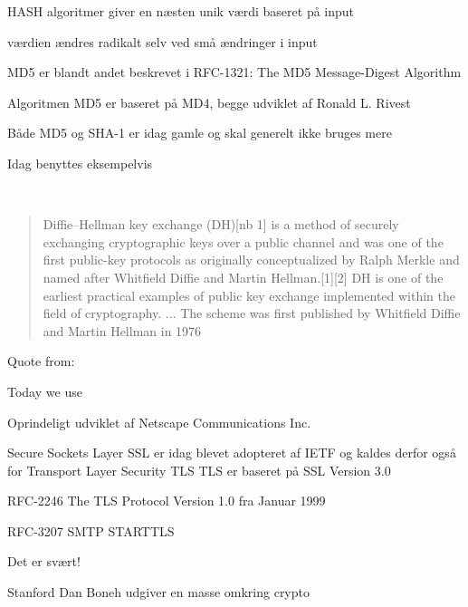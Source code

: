 \documentclass[Screen16to9,17pt]{foils}
\begin{document}


\begin{list1}
\item HASH algoritmer giver en næsten unik værdi baseret på input

\item værdien ændres radikalt selv ved små ændringer i input
\item MD5 er blandt andet beskrevet i RFC-1321: The MD5 Message-Digest
  Algorithm
\item Algoritmen MD5 er baseret på MD4, begge udviklet af Ronald
  L. Rivest
\item Både MD5 og SHA-1 er idag gamle og skal generelt ikke bruges mere
\item Idag benyttes eksempelvis 
\end{list1}




{~}

\begin{quote}
Diffie–Hellman key exchange (DH)[nb 1] is a method of securely exchanging cryptographic keys over a public channel and was one of the first public-key protocols as originally conceptualized by Ralph Merkle and named after Whitfield Diffie and Martin Hellman.[1][2] DH is one of the earliest practical examples of public key exchange implemented within the field of cryptography.
... The scheme was first published by Whitfield Diffie and Martin Hellman in 1976
\end{quote}

\begin{list2}
\item Quote from: {\small {}}
\item Today we use 
\end{list2}




\begin{list1}
\item Oprindeligt udviklet af Netscape Communications Inc.
\item Secure Sockets Layer SSL er idag blevet adopteret af IETF og kaldes
derfor også for Transport Layer Security TLS
TLS er baseret på SSL Version 3.0
\item RFC-2246 The TLS Protocol Version 1.0 fra Januar 1999
\item RFC-3207 SMTP STARTTLS
\item Det er svært!
\item Stanford Dan Boneh udgiver en masse omkring crypto\\ 
\end{list1}
\end{document}
